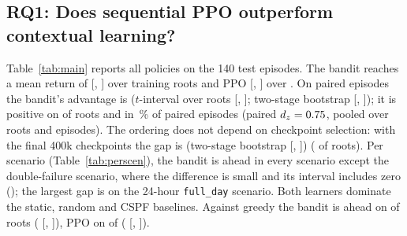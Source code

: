 \subsection{RQ1: Does sequential PPO outperform contextual learning?}
\label{sec:rq1}

Table~\ref{tab:main} reports all policies on the 140 test episodes. The bandit
reaches a mean return of \TestBandit{} [\TestBanditLo, \TestBanditHi] over
\TestBanditRoots{} training roots and PPO \TestPPO{} [\TestPPOLo, \TestPPOHi]
over \TestPPORoots{}. On paired episodes the bandit's advantage is \Gap{}
($t$-interval over roots [\GapTLo, \GapTHi]; two-stage bootstrap
[\GapLo, \GapHi]); it is positive on \GapRootsPositive{} of \GapRoots{} roots
and in \GapWinRate\,\% of paired episodes (paired $d_z=0.75$, pooled over roots and episodes). The ordering does not
depend on checkpoint selection: with the final 400k checkpoints the gap is
\GapFinal{} (two-stage bootstrap [\GapFinalLo, \GapFinalHi]) (\GapFinalRootsPositive{} of \GapRoots{}
roots).
Per scenario (Table~\ref{tab:perscen}), the bandit is ahead in every
scenario except the double-failure scenario, where the difference is small
and its interval includes zero (\GapDoublefailure{}); the
largest gap is on the 24-hour \texttt{full\_day} scenario. Both learners
dominate the static, random and CSPF baselines. Against greedy the bandit is
ahead on \BanditMinusGreedyRootsPositive{} of \GapRoots{} roots
(\BanditMinusGreedy{} [\BanditMinusGreedyLo, \BanditMinusGreedyHi]), PPO on
\PPOMinusGreedyRootsPositive{} of \GapRoots{} (\PPOMinusGreedy{}
[\PPOMinusGreedyLo, \PPOMinusGreedyHi]).

